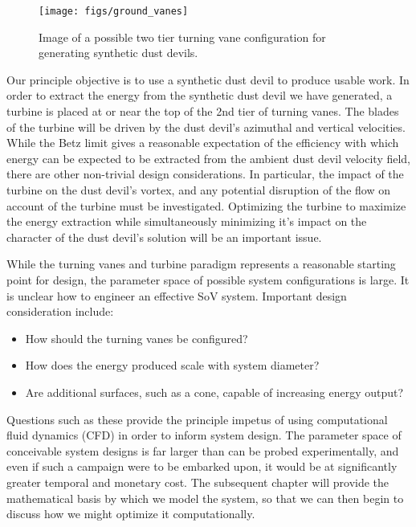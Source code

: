   \begin{figure}[!htb]
    \begin{center}
     \texttt{[image: figs/ground\_vanes]}
     \caption{Image of a possible two tier turning vane 
       configuration for generating synthetic dust devils.}
     \label{fig:cartoon}
    \end{center}
  \end{figure}


Our principle objective is to use a synthetic dust devil to produce 
usable work. In order to extract the energy from the synthetic dust
devil we have generated, a turbine is placed 
at or near the top of the 2nd tier of turning vanes. 
The blades of the turbine will be driven by the dust devil's azimuthal
and vertical velocities. While the Betz limit gives a reasonable
expectation of the efficiency with which energy can be expected to be
extracted from the ambient dust devil velocity field, there are other
non-trivial design considerations. In particular, the impact of the
turbine on the dust devil's vortex, and any potential disruption of the
flow on account of the turbine must be investigated. Optimizing the
turbine to maximize the energy extraction while simultaneously
minimizing it's impact on the character of the dust devil's solution
will be an important issue.

While the turning vanes and turbine  
paradigm represents a reasonable starting point for design, the
parameter space of possible system configurations is large. It is
unclear how to engineer an effective SoV system. Important design
consideration include: 
\begin{itemize}
  \item How should the turning vanes be configured?
  \item How does the energy produced scale with system diameter?
  \item Are additional surfaces, such as a cone, capable of increasing energy output?
\end{itemize}

Questions such as these provide the principle impetus of using
computational fluid dynamics (CFD) in order to inform system design. The
parameter space of conceivable system designs is far larger than can be
probed experimentally, and even if such a campaign were to be embarked
upon, it would be at significantly greater temporal and monetary
cost. The subsequent chapter will provide the mathematical basis by which
we model the system, so that we can then begin to discuss how we might
optimize it computationally.  


